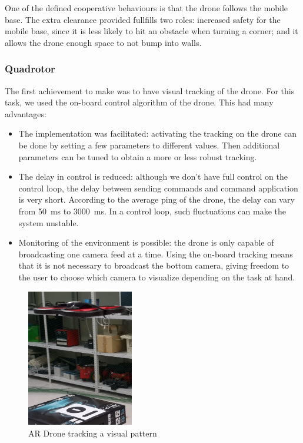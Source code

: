 \documentclass[11pt,a4paper]{article}
\begin{document}
One of the defined cooperative behaviours is that the drone follows the mobile base.  The extra clearance provided fullfills two roles: increased safety for the mobile base, since it is less likely to hit an obstacle when turning a corner; and it allows the drone enough space to not bump into walls. 


\subsubsection{Quadrotor}
The first achievement to make was to have visual tracking of the drone. For this task, we used 
the on-board control algorithm of the drone. This had many advantages: 
\begin{itemize}
\item The implementation was facilitated: activating the tracking on the drone can be done by 
setting a few parameters to different values. Then additional parameters can be tuned to
obtain a more or less robust tracking.

\item The delay in control is reduced: although we don't have full control on the control
loop, the delay between sending commands and command application is very short. According to
the average ping of the drone, the delay can vary from 50~ms to 3000~ms. In a control loop,
such fluctuations can make the system unstable.

\item Monitoring of the environment is possible: the drone is only capable of broadcasting one camera feed at a time. Using the on-board tracking means that it is not necessary to broadcast the bottom camera, giving freedom to the user to choose which camera to visualize depending on the task at hand.

\end{itemize}


\begin{figure}[ht]
	\centering
    \includegraphics[height=6cm]{visualTracking.png}
    \caption{AR Drone tracking a visual pattern}
    \label{fig:visualTracking}
\end{figure}
\end{document}
